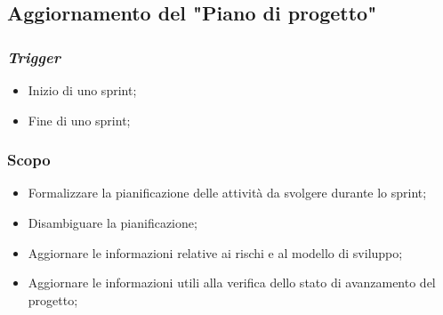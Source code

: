 \subsection{Aggiornamento del "Piano di progetto"}
\label{aggiornare-pdp}

\subsubsection{\textit{Trigger}}
\begin{itemize}
	\item Inizio di uno sprint;
	\item Fine di uno sprint;
\end{itemize}

\subsubsection{Scopo}
\begin{itemize}
	\item Formalizzare la pianificazione delle attività da svolgere durante
	      lo sprint;

	\item Disambiguare la pianificazione;

	\item Aggiornare le informazioni relative ai rischi e al modello di
	      sviluppo;

	\item Aggiornare le informazioni utili alla verifica dello stato di
	      avanzamento del progetto;
\end{itemize}

